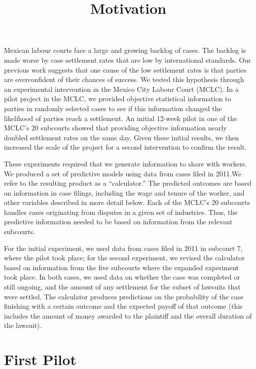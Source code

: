 \documentclass[]{article}
\title{Motivation}
\author{}
\date{}
\begin{document}
\maketitle

Mexican labour courts face a large and growing backlog of cases. The
backlog is made worse by case settlement rates that are low by
international standards. Our previous work suggests that one cause of
the low settlement rates is that parties are overconfident of their
chances of success. We tested this hypothesis through an experimental
intervention in the Mexico City Labour Court (MCLC). In a pilot project
in the MCLC, we provided objective statistical information to parties in
randomly selected cases to see if this information changed the
likelihood of parties reach a settlement. An initial 12-week pilot in
one of the MCLC's 20 subcourts showed that providing objective
information nearly doubled settlement rates on the same day. Given these
initial results, we then increased the scale of the project for a second
intervention to confirm the result.

These experiments required that we generate information to share with
workers. We produced a set of predictive models using data from cases
filed in 2011.We refer to the resulting product as a ``calculator.'' The
predicted outcomes are based on information in case filings, including
the wage and tenure of the worker, and other variables described in more
detail below. Each of the MCLC's 20 subcourts handles cases originating
from disputes in a given set of industries. Thus, the predictive
information needed to be based on information from the relevant
subcourts.

For the initial experiment, we used data from cases filed in 2011 in
subcourt 7, where the pilot took place; for the second experiment, we
revised the calculator based on information from the five subcourts
where the expanded experiment took place. In both cases, we used data on
whether the case was completed or still ongoing, and the amount of any
settlement for the subset of lawsuits that were settled. The calculator
produces predictions on the probability of the case finishing with a
certain outcome and the expected payoff of that outcome (this includes
the amount of money awarded to the plaintiff and the overall duration of
the lawsuit).

\section{First Pilot}\label{first-pilot}
\end{document}
